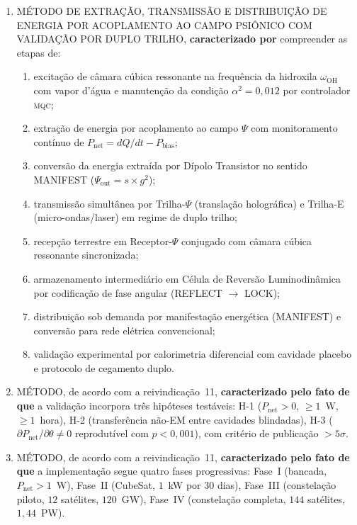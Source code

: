 \documentclass[12pt,a4paper]{article}
\newcommand{\alphaii}{\alpha^2}
\newcommand{\Psifield}{\Psi}
\newcommand{\MQC}{\textsc{mqc}}
\newcommand{\Pnet}{P_{\text{net}}}
\newcommand{\Pbias}{P_{\text{bias}}}
\begin{document}
\begin{enumerate}[label=\textbf{\arabic*.}, leftmargin=*, itemsep=0.8em]

\item MÉTODO DE EXTRAÇÃO, TRANSMISSÃO E DISTRIBUIÇÃO DE ENERGIA POR ACOPLAMENTO AO CAMPO PSIÔNICO COM VALIDAÇÃO POR DUPLO TRILHO, \textbf{caracterizado por} compreender as etapas de:
\begin{enumerate}[label=(\alph*)]
\item excitação de câmara cúbica ressonante na frequência da hidroxila $\omega_{\text{OH}}$ com vapor d'água e manutenção da condição $\alphaii = 0{,}012$ por controlador \MQC;
\item extração de energia por acoplamento ao campo $\Psifield$ com monitoramento contínuo de $\Pnet = dQ/dt - \Pbias$;
\item conversão da energia extraída por Dípolo Transistor no sentido MANIFEST ($\Psifield_{\text{out}} = s \times g^2$);
\item transmissão simultânea por Trilha-$\Psifield$ (translação holográfica) e Trilha-E (micro-ondas/laser) em regime de duplo trilho;
\item recepção terrestre em Receptor-$\Psifield$ conjugado com câmara cúbica ressonante sincronizada;
\item armazenamento intermediário em Célula de Reversão Luminodinâmica por codificação de fase angular (REFLECT $\to$ LOCK);
\item distribuição sob demanda por manifestação energética (MANIFEST) e conversão para rede elétrica convencional;
\item validação experimental por calorimetria diferencial com cavidade placebo e protocolo de cegamento duplo.
\end{enumerate}

\item MÉTODO, de acordo com a reivindicação~11, \textbf{caracterizado pelo fato de que} a validação incorpora três hipóteses testáveis: H-1 ($\Pnet > 0$, $\geq 1$~W, $\geq 1$~hora), H-2 (transferência não-EM entre cavidades blindadas), H-3 ($\partial\Pnet/\partial\theta \neq 0$ reprodutível com $p < 0{,}001$), com critério de publicação $> 5\sigma$.

\item MÉTODO, de acordo com a reivindicação~11, \textbf{caracterizado pelo fato de que} a implementação segue quatro fases progressivas: Fase~I (bancada, $\Pnet > 1$~W), Fase~II (CubeSat, $1$~kW por $30$ dias), Fase~III (constelação piloto, $12$ satélites, $120$~GW), Fase~IV (constelação completa, $144$ satélites, $1{,}44$~PW).


\end{enumerate}
\end{document}
